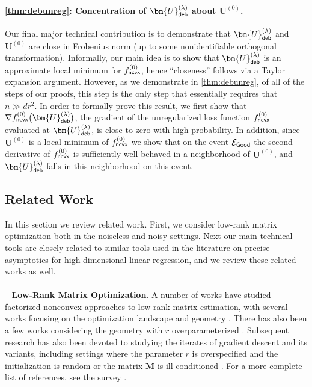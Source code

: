\documentclass[10pt]{article}
\theoremstyle{definition}
\begin{document}
\paragraph{\cref{thm:debunreg}: Concentration of $\bm{U}_{{\sf deb}}^{(\lambda)}$ about $\bm{U}^{(0)}$.}    
 Our final  major technical contribution is to demonstrate that  $\bm{U}_{{\sf deb}}^{(\lambda)}$ and $\bm{U}^{(0)}$ are close in Frobenius norm (up to some nonidentifiable orthogonal transformation).  Informally, our main idea is to show that $\bm{U}_{{\sf deb}}^{(\lambda)}$ is an approximate local minimum for $f^{(0)}_{{\sf ncvx}}$, hence ``closeness'' follows via a Taylor expansion argument.  However, as we demonstrate in \cref{thm:debunreg}, of all of the steps of our proofs, this step is the only step that essentially requires that $n \gg  d r^2$. In order to formally prove this result, we first show that $\nabla f^{(0)}_{{\sf ncvx}}\big( \bm{U}_{{\sf deb}}^{(\lambda)}\big)$, the gradient of the unregularized loss function $f^{(0)}_{{\sf ncvx}}$ evaluated at $\bm{U}_{{\sf deb}}^{(\lambda)}$, 
 is close to zero with high probability.  In addition, since $\bm{U}^{(0)}$ is a local minimum of $f^{(0)}_{{\sf ncvx}}$ we show that on the event $\mathcal{E}_{{\sf Good}}$ the second derivative of $f^{(0)}_{{\sf ncvx}}$ is sufficiently well-behaved in a neighborhood of $\bm{U}^{(0)}$, and $\bm{U}^{(\lambda)}_{{\sf deb}}$ falls in this neighborhood on this event.   
 

  










\subsection{Related Work} \label{sec:relatedwork}
In this section we review related work.  First, we consider low-rank matrix optimization both in the noiseless and noisy settings.  Next our main technical tools are closely related to similar tools used in the literature on precise asymptotics for high-dimensional linear regression, and we review these related works as well.  \\
\\ \ \noindent
\textbf{Low-Rank Matrix Optimization}. A number of works have studied factorized nonconvex approaches to low-rank matrix estimation, with several works focusing on the optimization landscape and geometry \citep{ge_no_2017,bhojanapalli_global_2016}.  
There has also been a few works considering the geometry with $r$ overparameterized \citep{zhang_sharp_2021,ma_geometric_2023,ma_optimization_2023}.   Subsequent research has also been devoted to studying the iterates of gradient descent and its variants, including settings where the parameter $r$ is overspecified and the initialization is random 
\citep{stoger_small_2021,soltanolkotabi_implicit_2025,ma_geometric_2023} or  the matrix $\bm{M}$ is ill-conditioned \citep{tong_low-rank_2021,zhang_fast_2023,xu_power_2023}. For a more complete list of references, see the survey \citet{chi_nonconvex_2019}. 
\end{document}

